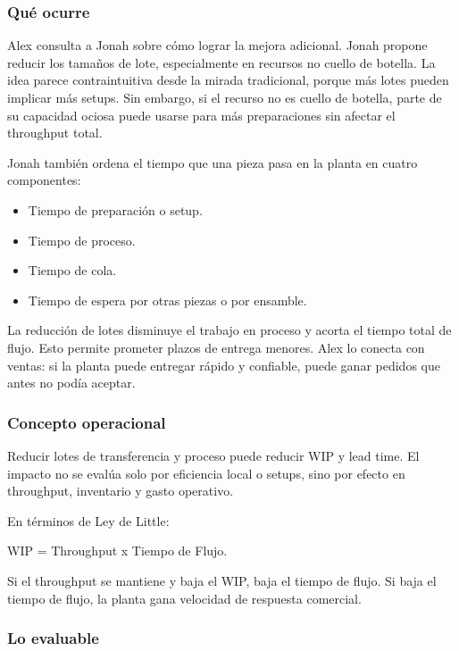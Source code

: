 \documentclass[
  11pt,
]{article}
\providecommand{\tightlist}{%
  \setlength{\itemsep}{0pt}\setlength{\parskip}{0pt}}
\begin{document}
\hypertarget{quuxe9-ocurre-1}{%
\subsubsection{Qué ocurre}\label{quuxe9-ocurre-1}}

Alex consulta a Jonah sobre cómo lograr la mejora adicional. Jonah
propone reducir los tamaños de lote, especialmente en recursos no cuello
de botella. La idea parece contraintuitiva desde la mirada tradicional,
porque más lotes pueden implicar más setups. Sin embargo, si el recurso
no es cuello de botella, parte de su capacidad ociosa puede usarse para
más preparaciones sin afectar el throughput total.

Jonah también ordena el tiempo que una pieza pasa en la planta en cuatro
componentes:

\begin{itemize}
\tightlist
\item
  Tiempo de preparación o setup.
\item
  Tiempo de proceso.
\item
  Tiempo de cola.
\item
  Tiempo de espera por otras piezas o por ensamble.
\end{itemize}

La reducción de lotes disminuye el trabajo en proceso y acorta el tiempo
total de flujo. Esto permite prometer plazos de entrega menores. Alex lo
conecta con ventas: si la planta puede entregar rápido y confiable,
puede ganar pedidos que antes no podía aceptar.

\hypertarget{concepto-operacional-1}{%
\subsubsection{Concepto operacional}\label{concepto-operacional-1}}

Reducir lotes de transferencia y proceso puede reducir WIP y lead time.
El impacto no se evalúa solo por eficiencia local o setups, sino por
efecto en throughput, inventario y gasto operativo.

En términos de Ley de Little:

WIP = Throughput x Tiempo de Flujo.

Si el throughput se mantiene y baja el WIP, baja el tiempo de flujo. Si
baja el tiempo de flujo, la planta gana velocidad de respuesta
comercial.

\hypertarget{lo-evaluable-1}{%
\subsubsection{Lo evaluable}\label{lo-evaluable-1}}
\end{document}
